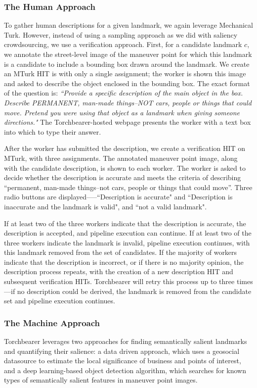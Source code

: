 \subsubsection{The Human Approach}\label{Sect:desc:human}
To gather human descriptions for a given landmark, we again leverage Mechanical Turk. However, instead of using a sampling approach as we did with saliency crowdsourcing, we use a verification approach.
First, for a candidate landmark $c$, we annotate the street-level image of the maneuver point for which this landmark is a candidate to include a bounding box drawn around the landmark. We create an MTurk HIT is with only a single assignment; the worker is shown this image and asked to describe the object enclosed in the bounding box. The exact format of the question is: \textit{``Provide a specific description of the main object in the box. Describe PERMANENT, man-made things--NOT cars, people or things that could move. Pretend you were using that object as a landmark when giving someone directions."} The Torchbearer-hosted webpage presents the worker with a text box into which to type their answer.

After the worker has submitted the description, we create a verification HIT on MTurk, with three assignments. The annotated maneuver point image, along with the candidate description, is shown to each worker. The worker is asked to decide whether the description is accurate and meets the criteria of describing “permanent, man-made things--not cars, people or things that could move”. Three radio buttons are displayed—--``Description is accurate" and ``Description is inaccurate and the landmark is valid", and ``not a valid landmark".

If at least two of the three workers indicate that the description is accurate, the description is accepted, and pipeline execution can continue. If at least two of the three workers indicate the landmark is invalid, pipeline execution continues, with this landmark removed from the set of candidates. If the majority of workers indicate that the description is incorrect, or if there is no majority opinion, the description process repeats, with the creation of a new description HIT and subsequent verification HITs. Torchbearer will retry this process up to three times---if no description could be derived, the landmark is removed from the candidate set and pipeline execution continues.

\subsubsection{The Machine Approach}
Torchbearer leverages two approaches for finding semantically salient landmarks and quantifying their salience: a data driven approach, which uses a geosocial datasource to estimate the local significance of business and points of interest, and a deep learning-based object detection algorithm, which searches for known types of semantically salient features in maneuver point images.
	
